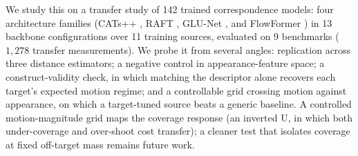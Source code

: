 We study this on a transfer study of 142 trained correspondence models: four
architecture families (CATs++ \cite{cho2022cats++}, RAFT \cite{teed2020raft},
GLU-Net \cite{truong2020glunet}, and FlowFormer \cite{huang2022flowformer}) in 13
backbone configurations over 11 training sources, evaluated on 9 benchmarks
($1{,}278$ transfer measurements). We probe it from several angles: replication
across three distance estimators; a negative control in appearance-feature space;
a construct-validity check, in which matching the descriptor alone recovers each
target's expected motion regime; and a controllable grid crossing motion against
appearance, on which a target-tuned source beats a generic baseline. A controlled
motion-magnitude grid maps the coverage response (an inverted U, in which both
under-coverage and over-shoot cost transfer); a cleaner test that isolates
coverage at fixed off-target mass remains future work.

